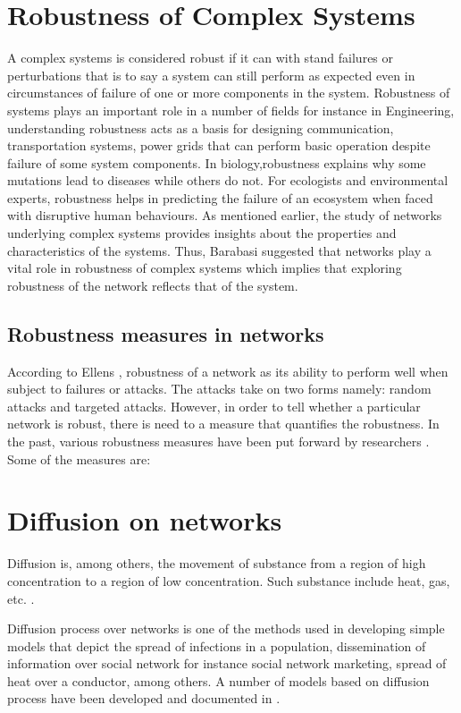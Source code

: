 \documentclass[10pt,a4paper]{article}
\begin{document}
	\section{Robustness of Complex Systems}
	A complex systems is considered robust if it can with stand failures or perturbations that is to say a system can still perform as expected even in circumstances of failure of one or more components in the system. Robustness of systems plays an important role in a number of fields for instance in Engineering, understanding robustness acts as a basis for designing communication, transportation systems, power grids that can perform basic operation despite failure of some system components. In biology,robustness explains why some mutations lead to diseases while others do not. For ecologists and environmental experts, robustness helps in predicting the failure of an ecosystem when faced with disruptive human behaviours. 
	As mentioned earlier, the study of networks underlying complex systems provides insights about the properties and characteristics of the systems. Thus, Barabasi \citep{barabasi2016network} suggested that networks play a vital role in robustness of complex systems which implies that exploring robustness of the network reflects that of the system.
	 
	\subsection{Robustness measures in networks}
	According to Ellens \citep{ellens2013graph}, robustness of a network as its ability to perform well when subject to failures or attacks. The attacks take on two forms namely: random attacks and targeted attacks. However, in order to tell whether a particular network is robust, there is need to a measure that quantifies the robustness. In the past, various robustness measures have been put forward by researchers \citep{sydney2008elasticity}. Some of the measures are:
	
    \section{Diffusion on networks}
    Diffusion is, among others, the movement of substance from a region of high concentration to a region of low concentration. Such substance include heat, gas, etc. \citep{newman2010networks}.
    
    Diffusion process over networks is one of the methods used in developing simple models that depict the spread of infections in a population, dissemination of information over social network for instance social network marketing, spread of heat over a conductor, among others. A number of models based on diffusion process have been developed and documented in \citep{estrada2011epidemic,kasprzak2012diffusion,lopez2008diffusion}.
    
\end{document}
